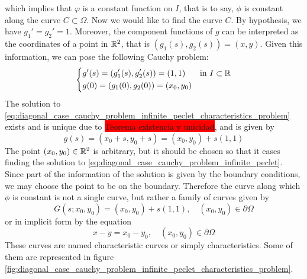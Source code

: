 which implies that $\varphi$ is a constant function on $I$, that is to say, $\phi$ is constant along the curve $C \subset \Omega$. Now we would like to find the curve $C$. By hypothesis, we have $g_1' = g_2' = 1$. Moreover, the component functions of $g$ can be interpreted as the coordinates of a point in $\mathbb{R}^2$, that is $(g_1(s), g_2(s)) = (x, y)$. Given this information, we can pose the following Cauchy problem:
\begin{equation} \label{eq:diagonal_case_cauchy_problem_infinite_peclet_characteristics_problem}
	\left\{
	\begin{aligned}
		&g'(s) = (g_1'(s), g_2'(s)) = (1, 1) & &\text{in } I \subset \mathbb{R} \\
		&g(0) = (g_1(0), g_2(0)) = (x_0, y_0)
	\end{aligned}
	\right.
\end{equation}
The solution to \eqref{eq:diagonal_case_cauchy_problem_infinite_peclet_characteristics_problem} exists and is unique due to \colorbox{red}{Teorema existencia y unicidad}, and is given by
\begin{equation}
	g(s) = (x_0 + s, y_0 + s) = (x_0, y_0) + s(1, 1)
\end{equation}
The point $(x_0, y_0) \in \mathbb{R}^2$ is arbitrary, but it should be chosen so that it eases finding the solution to \eqref{eq:diagonal_case_cauchy_problem_infinite_peclet}. Since part of the information of the solution is given by the boundary conditions, we may choose the point to be on the boundary. Therefore the curve along which $\phi$ is constant is not a single curve, but rather a family of curves given by
\begin{equation}
	G(s; x_0, y_0) = (x_0, y_0) + s(1, 1), \quad (x_0, y_0) \in \partial \Omega
\end{equation}
or in implicit form by the equation
\begin{equation} \label{eq:diagonal_case_cauchy_problem_infinite_peclet_characteristics_implicit_form}
	x - y = x_0 - y_0, \quad (x_0, y_0) \in \partial \Omega
\end{equation}
These curves are named characteristic curves or simply characteristics. Some of them are represented in figure \ref{fig:diagonal_case_cauchy_problem_infinite_peclet_characteristics_problem}.

